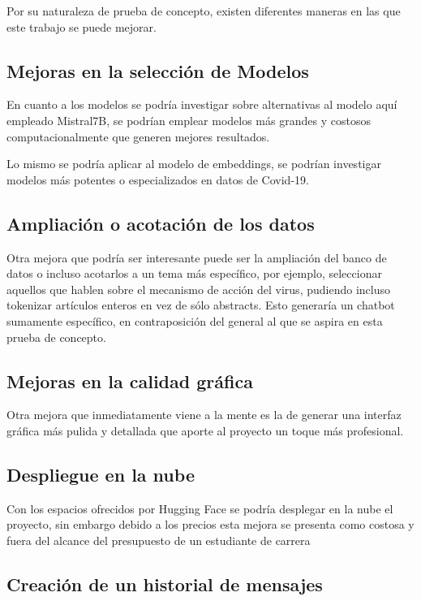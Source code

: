 
Por su naturaleza de prueba de concepto, existen diferentes maneras en las que este trabajo se puede mejorar.

\subsection{Mejoras en la selección de Modelos}

En cuanto a los modelos se podría investigar sobre alternativas al modelo aquí empleado Mistral7B, se podrían emplear modelos más grandes y costosos computacionalmente que generen mejores resultados.

Lo mismo se podría aplicar al modelo de embeddings, se podrían investigar modelos más potentes o especializados en datos de Covid-19.

\subsection{Ampliación o acotación de los datos}

Otra mejora que podría ser interesante puede ser la ampliación del banco de datos o incluso acotarlos a un tema más específico, por ejemplo, seleccionar aquellos que hablen sobre el mecanismo de acción del virus, pudiendo incluso tokenizar artículos enteros en vez de sólo abstracts. Esto generaría un chatbot sumamente específico, en contraposición del general al que se aspira en esta prueba de concepto.

\subsection{Mejoras en la calidad gráfica}

Otra mejora que inmediatamente viene a la mente es la de generar una interfaz gráfica más pulida y detallada que aporte al proyecto un toque más profesional.

\subsection{Despliegue en la nube}

Con los espacios ofrecidos por Hugging Face %
se podría desplegar en la nube el proyecto, sin embargo debido a los precios esta mejora se presenta como costosa y fuera del alcance del presupuesto de un estudiante de carrera

\subsection{Creación de un historial de mensajes}

